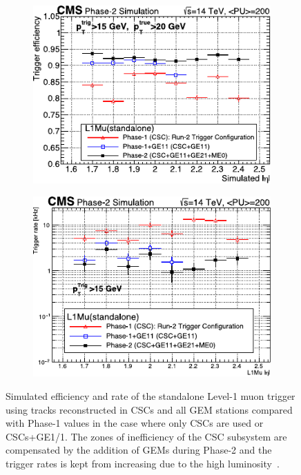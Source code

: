 	\begin{figure}[H]
		\begin{subfigure}{0.5\linewidth}
			\centering
			\includegraphics[width=.9\linewidth]{fig/chapt4/GEM-Trigger-efficiency.pdf}
			\caption{\label{fig:GEM-Muon:A}}
		\end{subfigure}
		\begin{subfigure}{0.5\linewidth}
			\centering
			\includegraphics[width=.9\linewidth]{fig/chapt4/GEM-Trigger-rate.pdf}
			\caption{\label{fig:GEM-Muon:B}}
		\end{subfigure}
		
		\caption{\label{fig:GEM-Trigger} Simulated  efficiency and  rate of the standalone Level-1 muon trigger using tracks reconstructed in CSCs and all GEM stations compared with Phase-1 values in the case where only CSCs are used or CSCs+GE1/1. The zones of inefficiency of the CSC subsystem are compensated by the addition of GEMs during Phase-2 and the trigger rates is kept from increasing due to the high luminosity~\cite{PHASEIITP}.}
	\end{figure}
	
